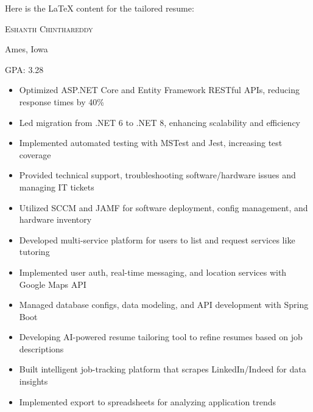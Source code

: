 \documentclass[letterpaper,11pt]{article}
\newcommand{\name}[1]{\centerline{\Huge \scshape #1}\vspace{1.25ex}}
\newcommand{\address}[1]{\centerline{#1}\vspace{-7pt}}
\begin{document}
Here is the LaTeX content for the tailored resume:

\name{Eshanth Chinthareddy}
\address{Ames, Iowa}

\makecvheader

{GPA: 3.28}


{
\begin{itemize}
\itemsep -2pt {}
\item Optimized ASP.NET Core and Entity Framework RESTful APIs, reducing response times by 40\%
\item Led migration from .NET 6 to .NET 8, enhancing scalability and efficiency
\item Implemented automated testing with MSTest and Jest, increasing test coverage
\end{itemize}
}

{
\begin{itemize}
\itemsep -2pt {}  
\item Provided technical support, troubleshooting software/hardware issues and managing IT tickets
\item Utilized SCCM and JAMF for software deployment, config management, and hardware inventory
\end{itemize}
}

{
\begin{itemize}
\itemsep -2pt {}
\item Developed multi-service platform for users to list and request services like tutoring
\item Implemented user auth, real-time messaging, and location services with Google Maps API  
\item Managed database configs, data modeling, and API development with Spring Boot
\end{itemize}
}

{
\begin{itemize}  
\itemsep -2pt {}
\item Developing AI-powered resume tailoring tool to refine resumes based on job descriptions
\item Built intelligent job-tracking platform that scrapes LinkedIn/Indeed for data insights
\item Implemented export to spreadsheets for analyzing application trends
\end{itemize}
}
\end{document}
